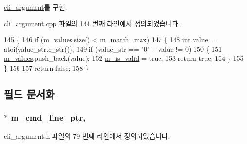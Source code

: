 \hyperlink{classcli__argument_a3fca6420b74bdd67ab37a11d86868800}{cli\+\_\+argument}를 구현.



cli\+\_\+argument.\+cpp 파일의 144 번째 라인에서 정의되었습니다.


\begin{DoxyCode}
145 \{
146     \textcolor{keywordflow}{if} (\hyperlink{classcli__argument__int_a36798cf959b4fd3cf2135baea640ab78}{m\_values}.size() < \hyperlink{classcli__argument_a6f9fd009acee86b73a9f1b8e80a95b43}{m\_match\_max})
147     \{
148         \textcolor{keywordtype}{int} value = atoi(value\_str.c\_str());
149         \textcolor{keywordflow}{if} (value\_str == \textcolor{stringliteral}{"0"} || value != 0)
150         \{
151             \hyperlink{classcli__argument__int_a36798cf959b4fd3cf2135baea640ab78}{m\_values}.push\_back(value);
152             \hyperlink{classcli__argument_a3163252d457c8ef3a286a8538d7e319f}{m\_is\_valid} = \textcolor{keyword}{true};
153             \textcolor{keywordflow}{return} \textcolor{keyword}{true};
154         \}
155     \}
156 
157     \textcolor{keywordflow}{return} \textcolor{keyword}{false};
158 \}
\end{DoxyCode}


\subsection{필드 문서화}
\subsubsection[{\texorpdfstring{m\+\_\+cmd\+\_\+line\+\_\+ptr}{m_cmd_line_ptr}}]{$\ast$ m\+\_\+cmd\+\_\+line\+\_\+ptr\hspace{0.3cm}{\ttfamily [protected]}, {\ttfamily [inherited]}}\hypertarget{classcli__argument_a802ef904236d4228f1b8edb3a96eb9cd}{}\label{classcli__argument_a802ef904236d4228f1b8edb3a96eb9cd}


cli\+\_\+argument.\+h 파일의 79 번째 라인에서 정의되었습니다.

